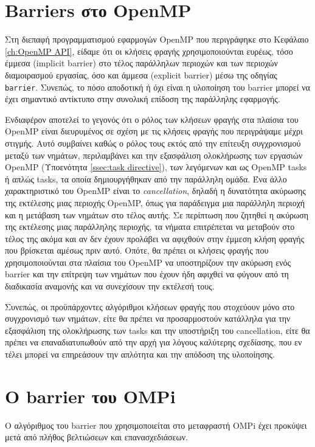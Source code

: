 \section{Barriers στο OpenMP}
\label{sec:Barriers in OpenMP}
Στη διεπαφή προγραμματισμού εφαρμογών OpenMP που περιγράφηκε στο Κεφάλαιο \ref{ch:OpenMP API}, είδαμε ότι οι κλήσεις φραγής χρησιμοποιούνται ευρέως, τόσο έμμεσα (implicit barrier) στο τέλος παράλληλων περιοχών και των περιοχών διαμοιρασμού εργασίας, όσο και άμμεσα (explicit barrier) μέσω της οδηγίας \texttt{barrier}. Συνεπώς, το πόσο αποδοτική ή όχι είναι η υλοποίηση του barrier μπορεί να έχει σημαντικό αντίκτυπο στην συνολική επίδοση της παράλληλης εφαρμογής. %

Ενδιαφέρον αποτελεί το γεγονός ότι ο ρόλος των κλήσεων φραγής στα πλαίσια του OpenMP είναι διευρυμένος σε σχέση με τις κλήσεις φραγής που περιγράψαμε μέχρι στιγμής. Αυτό συμβαίνει καθώς ο ρόλος τους εκτός από την επίτευξη συγχρονισμού μεταξύ των νημάτων, περιλαμβάνει και την εξασφάλιση ολοκλήρωσης των εργασιών OpenMP (Υποενότητα \ref{ssec:task directive}), των λεγόμενων και ως OpenMP tasks ή απλώς tasks, τα οποία δημιουργήθηκαν από την παράλληλη ομάδα. Ένα άλλο χαρακτηριστικό του OpenMP είναι το \textit{cancellation}, δηλαδή η δυνατότητα ακύρωσης της εκτέλεσης μιας περιοχής OpenMP, όπως για παράδειγμα μια παράλληλη περιοχή και η μετάβαση των νημάτων στο τέλος αυτής. Σε περίπτωση που ζητηθεί η ακύρωση της εκτέλεσης μιας παράλληλης περιοχής, τα νήματα επιτρέπεται να μεταβούν στο τέλος της ακόμα και αν δεν έχουν προλάβει να αφιχθούν στην έμμεση κλήση φραγής που βρίσκεται αμέσως πριν αυτό. Οπότε, θα πρέπει οι κλήσεις φραγής που χρησιμοποιούνται στα πλαίσια του OpenMP να υποστηρίζουν την ακύρωση ενός barrier και την επίτρεψη των νημάτων που έχουν ήδη αφιχθεί να φύγουν από τη διαδικασία αναμονής και να συνεχίσουν την εκτέλεσή τους.

Συνεπώς, οι προϋπάρχοντες αλγόριθμοι κλήσεων φραγής που στοχεύουν μόνο στο συγχρονισμό των νημάτων, είτε θα πρέπει να προσαρμοστούν κατάλληλα για την εξασφάλιση της ολοκλήρωσης των tasks και την υποστήριξη του cancellation, είτε θα πρέπει να επαναδιατυπωθούν από την αρχή για λόγους καλύτερης σχεδίασης, που εν τέλει μπορεί να επηρεάσουν την απλότητα και την απόδοση της υλοποίησης.

\section{Ο barrier του OMPi}
\label{sec:OMPi's barrier}
Ο αλγόριθμος του barrier που χρησιμοποιείται στο μεταφραστή OMPi έχει προκύψει μετά από πλήθος βελτιώσεων και επανασχεδιάσεων.

